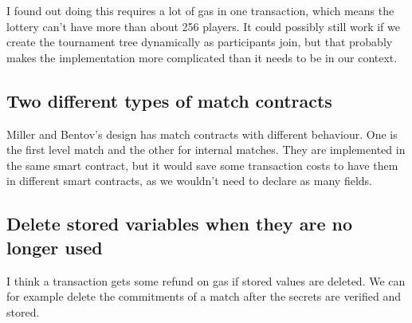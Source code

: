 I found out doing this requires a lot of gas in one transaction, which means the lottery can't have more than about 256 players. It could possibly still work if we create the tournament tree dynamically as participants join, but that probably makes the implementation more complicated than it needs to be in our context.

\subsection{Two different types of match contracts}
Miller and Bentov's design has match contracts with different behaviour. One is the first level match and the other for internal matches. They are implemented in the same smart contract, but it would save some transaction costs to have them in different smart contracts, as we wouldn't need to declare as many fields.

\subsection{Delete stored variables when they are no longer used}
I think a transaction gets some refund on gas if stored values are deleted. We can for example delete the commitments of a match after the secrets are verified and stored.